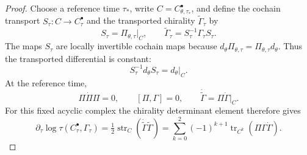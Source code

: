\documentclass[11pt,letterpaper,reqno]{amsart}
\theoremstyle{remark}
\newcommand{\tr}{\operatorname{tr}}
\begin{document}
\begin{proof}
Choose a reference time $\tau_*$, write
\(C=C^\bullet_{\theta,\tau_*}\), and define the cochain transport
$S_\tau:C\to C^\bullet_\tau$ and the transported chirality
$\widetilde\Gamma_\tau$ by
\[
 S_\tau=\Pi_{\theta,\tau}|_C,
 \qquad
 \widetilde\Gamma_\tau=S_\tau^{-1}\Gamma_\tau S_\tau.
\]
The maps \(S_\tau\) are locally invertible cochain maps because
\(d_\theta\Pi_{\theta,\tau}=\Pi_{\theta,\tau}d_\theta\).
Thus the transported differential is constant:
\begin{equation}\label{xp:constant-transported-differential}
 S_\tau^{-1}d_\theta S_\tau=d_\theta|_C.
\end{equation}
At the reference time,
\[
 \Pi\dot\Pi\Pi=0,
 \qquad [\Pi,\Gamma]=0,
 \qquad
 \dot{\widetilde\Gamma}=\Pi\dot\Gamma|_C.
\]
For this fixed acyclic complex the chirality determinant element
therefore gives
\begin{equation}\label{xp:chirality-derivative}
 \partial_\tau\log\tau(C^\bullet_\tau,\Gamma_\tau)
   =\tfrac12\operatorname{str}_C
                (\dot{\widetilde\Gamma}\widetilde\Gamma)
   =\sum_{k=0}^{2}(-1)^{k+1}
           \tr_{C^k}(\Pi\Gamma\dot\Gamma).
\end{equation}


\end{proof}
\end{document}
